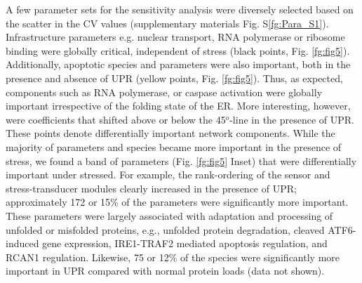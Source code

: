 \documentclass[fleqn,10pt]{wlscirep}
\begin{document}
A few parameter sets for the sensitivity analysis were diversely selected based on the scatter in the CV values (supplementary materials Fig. S\ref{fg:Para_S1}). Infrastructure parameters e.g. nuclear transport, RNA polymerase or ribosome binding were globally critical, independent of stress (black points, Fig. \ref{fg:fig5}). Additionally, apoptotic species and parameters were also important, both in the presence and absence of UPR (yellow points, Fig. \ref{fg:fig5}). Thus, as expected, components such as RNA polymerase, or caspase activation were globally important irrespective of the folding state of the ER. More interesting, however, were coefficients that shifted above or below the 45$^{o}$-line in the presence of UPR. These points denote differentially important network components. While the majority of parameters and species became more important in the presence of stress, we found a band of parameters (Fig. \ref{fg:fig5} Inset) that were differentially important under stressed. For example, the rank-ordering of the sensor and stress-transducer modules clearly increased in the presence of UPR; approximately 172 or 15\% of the parameters were significantly more important. These parameters were largely associated with adaptation and processing of unfolded or misfolded proteins, e.g., unfolded protein degradation, cleaved ATF6-induced gene expression, IRE1-TRAF2 mediated apoptosis regulation, and RCAN1 regulation. Likewise, 75 or 12\% of the species were significantly more important in UPR compared with normal protein loads (data not shown).
\end{document}
